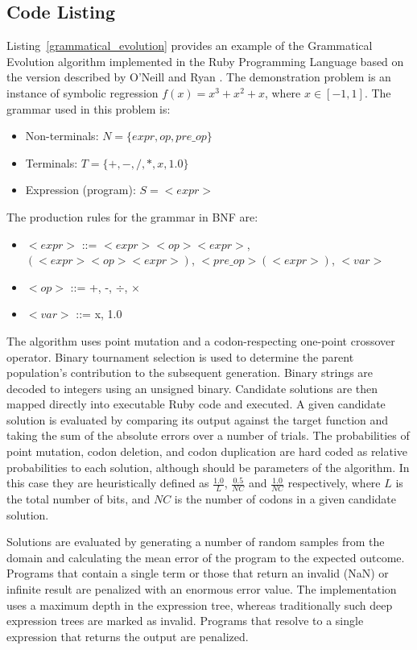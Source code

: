 \subsection{Code Listing}
Listing~\ref{grammatical_evolution} provides an example of the Grammatical Evolution algorithm implemented in the Ruby Programming Language based on the version described by O'Neill and Ryan \cite{O'Neill2001}.
The demonstration problem is an instance of symbolic regression $f(x)=x^3+x^2+x$, where $x\in[-1,1]$. 
The grammar used in this problem is: 
\begin{itemize}
	\item Non-terminals: $N=\{expr,op,pre\_op\}$
	\item Terminals: $T=\{+,-,/,*,x,1.0\}$
	\item Expression (program): $S=<expr>$
\end{itemize}

The production rules for the grammar in BNF are:
\begin{itemize}
	\item $<expr>$ ::= $<expr><op><expr>$, $(<expr><op><expr>)$, $<pre\_op>(<expr>)$, $<var>$
	\item $<op>$ ::= +, -, $\div$, $\times$
	\item $<var>$ ::= x, 1.0
\end{itemize}

The algorithm uses point mutation and a codon-respecting one-point crossover operator. Binary tournament selection is used to determine the parent population's contribution to the subsequent generation. 
Binary strings are decoded to integers using an unsigned binary. Candidate solutions are then mapped directly into executable Ruby code and executed. A given candidate solution is evaluated by comparing its output against the target function and taking the sum of the absolute errors over a number of trials. The probabilities of point mutation, codon deletion, and codon duplication are hard coded as relative probabilities to each solution, although should be parameters of the algorithm. In this case they are heuristically defined as $\frac{1.0}{L}$, $\frac{0.5}{NC}$ and $\frac{1.0}{NC}$ respectively, where $L$ is the total number of bits, and $NC$ is the number of codons in a given candidate solution.

Solutions are evaluated by generating a number of random samples from the domain and calculating the mean error of the program to the expected outcome. Programs that contain a single term or those that return an invalid (NaN) or infinite result are penalized with an enormous error value.
The implementation uses a maximum depth in the expression tree, whereas traditionally such deep expression trees are marked as invalid. Programs that resolve to a single expression that returns the output are penalized. 


